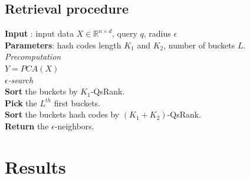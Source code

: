 \documentclass{article}
\newcommand{\RR}{\mathbb{R}}
\begin{document}
\subsection{Retrieval procedure}

\begin{algorithm}[H]

\textbf{Input} : input data $X \in \RR^{n \times d}$, query $q$, radius $\epsilon$\\
\textbf{Parameters}: hash codes length $K_1$ and $K_2$, number of buckets $L$.\\
\textit{Precomputation}\\
$Y = PCA(X)$\\
\textit{$\epsilon$-search}\\
\textbf{Sort} the buckets by $K_1$-QsRank.\\
\textbf{Pick} the $L^{th}$ first buckets.\\
\textbf{Sort} the buckets hash codes by $(K_1+K_2)$-QsRank.\\
\textbf{Return} the $\epsilon$-neighbors.
\end{algorithm}


\section{Results}

\end{document}
